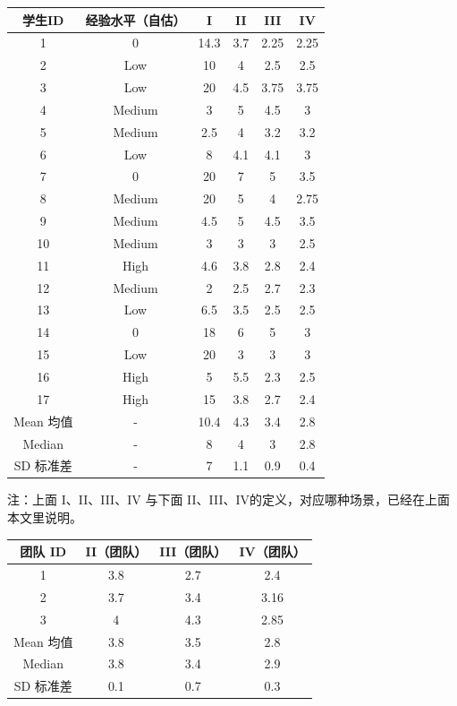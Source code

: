 

\begin{tabular}{|c|c|c|c|c|c|}
\hline
学生ID&经验水平（自估）&I&II&III&IV\\
\hline
1&0&14.3&3.7&2.25&2.25\\
\hline
2&Low&10&4&2.5&2.5 \\
\hline
3&Low&20&4.5&3.75&3.75 \\
\hline
4&Medium&3&5&4.5&3\\
\hline
5&Medium&2.5&4&3.2&3.2\\
\hline
6&Low&8&4.1&4.1&3\\
\hline
7&0&20&7&5&3.5\\
\hline
8&Medium&20&5&4&2.75\\
\hline
9&Medium&4.5&5&4.5&3.5\\
\hline
10&Medium&3&3&3&2.5\\
\hline
11&High&4.6&3.8&2.8&2.4\\
\hline
12&Medium&2&2.5&2.7&2.3\\
\hline
13&Low&6.5&3.5&2.5&2.5\\
\hline
14&0&18&6&5&3\\
\hline
15&Low&20&3&3&3\\
\hline
16&High&5&5.5&2.3&2.5\\
\hline
17&High&15&3.8&2.7&2.4\\
\hline
Mean 均值&-&10.4&4.3&3.4&2.8\\
\hline
Median&-&8&4&3&2.8\\
\hline
SD 标准差&-&7&1.1&0.9&0.4\\
\hline
\end{tabular}

注：上面 I、II、III、IV 与下面 II、III、IV的定义，对应哪种场景，已经在上面本文里说明。



\begin{tabular}{|c|c|c|c|}
\hline
团队 ID&II（团队）&III（团队）&IV（团队）\\
\hline
1&3.8&2.7&2.4\\
\hline
2&3.7&3.4&3.16\\
\hline
3&4&4.3&2.85\\
\hline
Mean 均值&3.8&3.5&2.8\\
\hline
Median&3.8&3.4&2.9\\
\hline
SD 标准差&0.1&0.7&0.3\\
\hline
\end{tabular}

